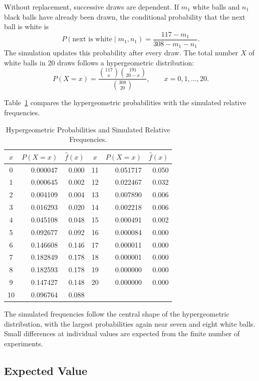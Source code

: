 \documentclass[12pt]{article}
\theoremstyle{definition}
\numberwithin{equation}{section}
\begin{document}
Without replacement, successive draws are dependent. If \(m_1\) white balls and \(n_1\) black balls have already been drawn, the conditional probability that the next ball is white is
\[
P(\text{next is white}\mid m_1,n_1)
=\frac{117-m_1}{308-m_1-n_1}.
\]
The simulation updates this probability after every draw. The total number \(X\) of white balls in 20 draws follows a hypergeometric distribution:
\[
P(X=x)=\frac{\binom{117}{x}\binom{191}{20-x}}{\binom{308}{20}},
\qquad x=0,1,\ldots,20.
\]

Table~\ref{tab:hyperpmf} compares the hypergeometric probabilities with the simulated relative frequencies.

\begin{table}[H]
\centering
\caption{Hypergeometric Probabilities and Simulated Relative Frequencies.}
\label{tab:hyperpmf}
\small
\begin{tabular}{crr@{\hspace{1.1cm}}crr}
\toprule
\(x\) & \(P(X=x)\) & \(\hat{f}(x)\) & \(x\) & \(P(X=x)\) & \(\hat{f}(x)\)\\
\midrule
0  & 0.000047 & 0.000 & 11 & 0.051717 & 0.050\\
1  & 0.000645 & 0.002 & 12 & 0.022467 & 0.032\\
2  & 0.004109 & 0.004 & 13 & 0.007890 & 0.006\\
3  & 0.016293 & 0.020 & 14 & 0.002218 & 0.006\\
4  & 0.045108 & 0.048 & 15 & 0.000491 & 0.002\\
5  & 0.092677 & 0.092 & 16 & 0.000084 & 0.000\\
6  & 0.146608 & 0.146 & 17 & 0.000011 & 0.000\\
7  & 0.182849 & 0.178 & 18 & 0.000001 & 0.000\\
8  & 0.182593 & 0.178 & 19 & 0.000000 & 0.000\\
9  & 0.147427 & 0.148 & 20 & 0.000000 & 0.000\\
10 & 0.096764 & 0.088 & & &\\
\bottomrule
\end{tabular}
\end{table}

The simulated frequencies follow the central shape of the hypergeometric distribution, with the largest probabilities again near seven and eight white balls. Small differences at individual values are expected from the finite number of experiments.

\subsection{Expected Value}
\end{document}
